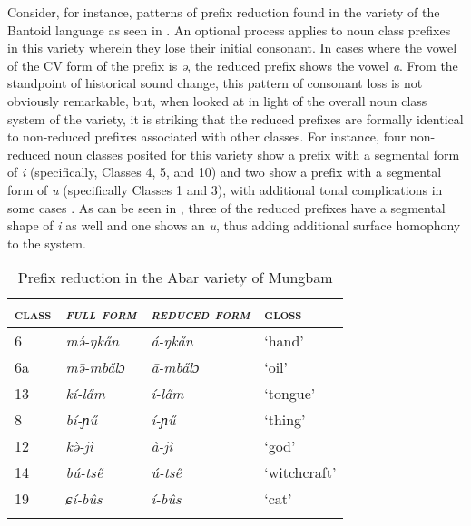 \documentclass[output=paper ,collection	  ,collectionchapter ,biblatexbackend=biber   ]{langscibook}
\def\sh{ɕ}
\begin{document}
Consider, for instance, patterns of prefix reduction found in the  variety
of the Bantoid language  as seen in 
\cite[136]{LovegrenMungbam}. An optional process applies to noun class prefixes
in this variety wherein they lose their initial consonant. In cases where the
vowel of the CV form of the prefix is \emph{ə}, the reduced prefix shows the
vowel \emph{a}. From the standpoint of historical sound change, this pattern of
consonant loss is not obviously remarkable, but, when looked at in light of the
overall noun class system of the variety, it is striking that the reduced
prefixes are formally identical to non-reduced prefixes associated with other
classes. For instance, four non-reduced noun classes posited for this variety
show a prefix with a segmental form of \emph{i} (specifically, Classes 4, 5, and
10) and two show a prefix with a segmental form of \emph{u} (specifically
Classes 1 and 3), with additional tonal complications in some cases
\cite[111]{LovegrenMungbam}. As can be seen in , three of the
reduced prefixes have a segmental shape of \emph{i} as well and one shows an
\emph{u}, thus adding additional surface homophony to the system.


\begin{table}  
	\renewcommand{\gl}[1]{`#1'} 
	{ 
	\begin{tabular}{l>{\em}l>{\em}ll}
	\lsptoprule
	 {\scshape{class}}	&	{\scshape{full form}}	 		&	{\scshape{reduced form}}			&	{\scshape{gloss}}		\\
	 \midrule
	 6				&	{m\'ə-ŋ⁠{ka̋n}}	&	{á-ŋ⁠ka̋n}			&	{\gl{hand}}		\\
	 6a				&	{m\=ə-mba̋lɔ}	&	{ā-mba̋lɔ}			&	{\gl{oil}}		\\
	 13				&	{kí-la̋m}			&	{í-la̋m}				&	{\gl{tongue}}	\\
	 8				&	{bí-ɲ⁠ű}		&	{í-ɲ⁠ű}				&	{\gl{thing}}	\\	%
	 12				&	{k\`ə-jì}			&	{à-jì}					&	{\gl{god}}		\\
	 14				&	{bú-tse̋}			&	{ú-tse̋}				&	{\gl{witchcraft}}\\
	 19				&	{{\sh}í-bûs}			&	{í-bûs}				&	{\gl{cat}}		\\
	\lspbottomrule
	\end{tabular}}
	\caption{Prefix reduction in the Abar variety of Mungbam \label{AbarRed}}
\end{table}
\end{document}
